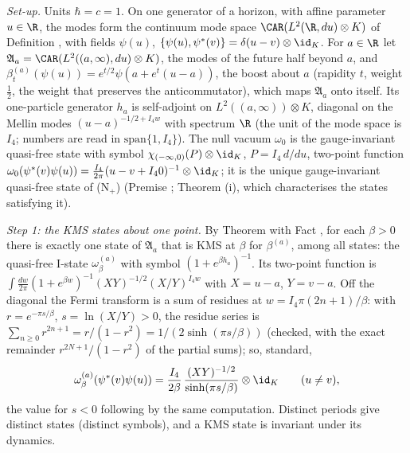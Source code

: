 \emph{Set-up.} Units $\hbar = c = 1$. On one generator of a horizon, with affine parameter $u \in \R$, the modes form the continuum mode space $\CAR(L^{2}(\R, du)\otimes K)$ of Definition , with fields $\psi(u)$, $\{\psi(u), \psi^{*}(v)\} = \delta(u - v)\otimes\id_{K}$. For $a \in \R$ let $\mathfrak{A}_{a} = \CAR(L^{2}((a, \infty), du)\otimes K)$, the modes of the future half beyond $a$, and $\beta^{(a)}_{t}(\psi(u)) = e^{t/2}\psi(a + e^{t}(u - a))$, the boost about $a$ (rapidity $t$, weight $\tfrac12$, the weight that preserves the anticommutator), which maps $\mathfrak{A}_{a}$ onto itself. Its one-particle generator $h_{a}$ is self-adjoint on $L^{2}((a, \infty))\otimes K$, diagonal on the Mellin modes $(u - a)^{-1/2 + I_{4}w}$ with spectrum $\R$ (the unit of the mode space is $I_{4}$; numbers are read in $\mathrm{span}\{1, I_{4}\}$). The null vacuum $\omega_{0}$ is the gauge-invariant quasi-free state with symbol $\chi_{(-\infty, 0)}(P)\otimes\id_{K}$, $P = I_{4}\,d/du$, two-point function $\omega_{0}(\psi^{*}(v)\psi(u)) = \tfrac{I_{4}}{2\pi}(u - v + I_{4}0)^{-1}\otimes\id_{K}$; it is the unique gauge-invariant quasi-free state of (N$_{+}$) (Premise ; Theorem (i), which characterises the states satisfying it).

\emph{Step 1: the KMS states about one point.} By Theorem  with Fact , for each $\beta > 0$ there is exactly one state of $\mathfrak{A}_{a}$ that is KMS at $\beta$ for $\beta^{(a)}$, among all states: the quasi-free I-state $\omega^{(a)}_{\beta}$ with symbol $(1 + e^{\beta h_{a}})^{-1}$. Its two-point function is $\int\frac{dw}{2\pi}(1 + e^{\beta w})^{-1}(XY)^{-1/2}(X/Y)^{I_{4}w}$ with $X = u - a$, $Y = v - a$. Off the diagonal the Fermi transform is a sum of residues at $w = I_{4}\pi(2n + 1)/\beta$: with $r = e^{-\pi s/\beta}$, $s = \ln(X/Y) > 0$, the residue series is $\sum_{n \ge 0}r^{2n + 1} = r/(1 - r^{2}) = 1/(2\sinh(\pi s/\beta))$ (checked, with the exact remainder $r^{2N+1}/(1 - r^{2})$ of the partial sums); so, standard,
\[
\omega^{(a)}_{\beta}(\psi^{*}(v)\psi(u)) = \frac{I_{4}}{2\beta}\,\frac{(XY)^{-1/2}}{\sinh(\pi s/\beta)}\otimes\id_{K}\qquad(u \ne v),
\]
the value for $s < 0$ following by the same computation. Distinct periods give distinct states (distinct symbols), and a KMS state is invariant under its dynamics.

